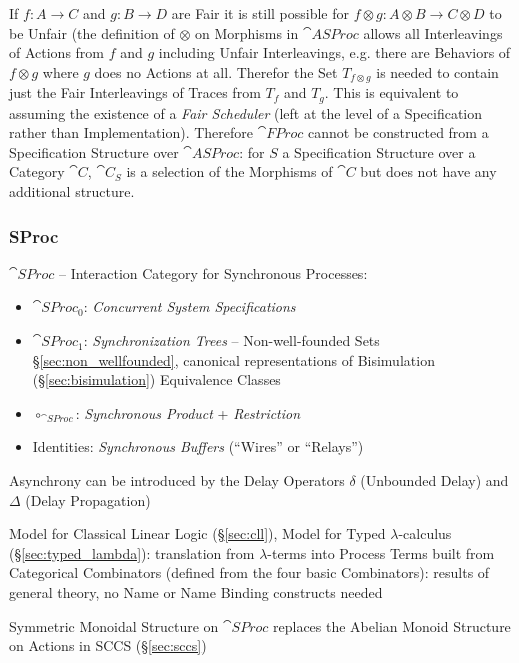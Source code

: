 If $f : A \rightarrow C$ and $g : B \rightarrow D$ are Fair it is
still possible for $f \otimes g : A \otimes B \rightarrow C \otimes D$
to be Unfair (the definition of $\otimes$ on Morphisms in
$\cat{ASProc}$ allows all Interleavings of Actions from $f$ and $g$
including Unfair Interleavings, e.g. there are Behaviors of $f \otimes
g$ where $g$ does no Actions at all. Therefor the Set $T_{f \otimes
  g}$ is needed to contain just the Fair Interleavings of Traces from
$T_f$ and $T_g$. This is equivalent to assuming the existence of a
\emph{Fair Scheduler} (left at the level of a Specification rather
than Implementation). Therefore $\cat{FProc}$ cannot be constructed
from a Specification Structure over $\cat{ASProc}$: for $S$ a
Specification Structure over a Category $\cat{C}$, $\cat{C}_S$ is a
selection of the Morphisms of $\cat{C}$ but does not have any
additional structure. %



\subsubsection{SProc}\label{sec:sproc}

$\cat{SProc}$ -- Interaction Category for Synchronous Processes:
\begin{itemize}
  \item $\cat{SProc}_0$: \emph{Concurrent System Specifications}
  \item $\cat{SProc}_1$: \emph{Synchronization Trees} --
    Non-well-founded Sets \S\ref{sec:non_wellfounded}, canonical
    representations of Bisimulation (\S\ref{sec:bisimulation})
    Equivalence Classes
  \item $\circ_{\cat{SProc}}$: \emph{Synchronous Product} +
    \emph{Restriction}
  \item Identities: \emph{Synchronous Buffers} (``Wires'' or
    ``Relays'')
\end{itemize}

Asynchrony can be introduced by the Delay Operators $\delta$
(Unbounded Delay) and $\Delta$ (Delay Propagation)

Model for Classical Linear Logic (\S\ref{sec:cll}), Model for Typed
$\lambda$-calculus (\S\ref{sec:typed_lambda}): translation from
$\lambda$-terms into Process Terms built from Categorical Combinators
(defined from the four basic Combinators): results of general theory,
no Name or Name Binding constructs needed

Symmetric Monoidal Structure on $\cat{SProc}$ replaces the Abelian
Monoid Structure on Actions in SCCS (\S\ref{sec:sccs})

